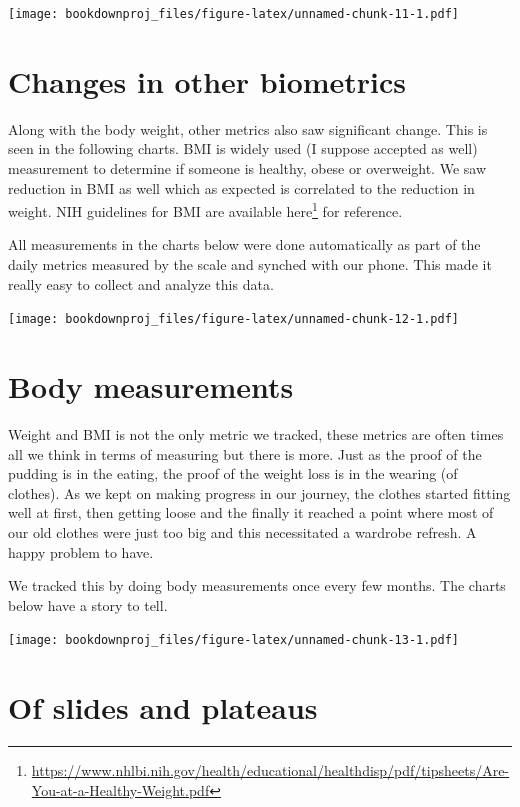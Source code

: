 \documentclass[
  oneside]{book}
\DeclareRobustCommand{\href}[2]{#2\footnote{\url{#1}}}
\begin{document}
\texttt{[image: bookdownproj\_files/figure-latex/unnamed-chunk-11-1.pdf]}

\hypertarget{changes-in-other-biometrics}{%
\section{Changes in other biometrics}\label{changes-in-other-biometrics}}

Along with the body weight, other metrics also saw significant change. This is seen in the following charts. BMI is widely used (I suppose accepted as well) measurement to determine if someone is healthy, obese or overweight. We saw reduction in BMI as well which as expected is correlated to the reduction in weight. NIH guidelines for BMI are available \href{https://www.nhlbi.nih.gov/health/educational/healthdisp/pdf/tipsheets/Are-You-at-a-Healthy-Weight.pdf}{here} for reference.

All measurements in the charts below were done automatically as part of the daily metrics measured by the scale and synched with our phone. This made it really easy to collect and analyze this data.

\texttt{[image: bookdownproj\_files/figure-latex/unnamed-chunk-12-1.pdf]}

\hypertarget{body-measurements}{%
\section{Body measurements}\label{body-measurements}}

Weight and BMI is not the only metric we tracked, these metrics are often times all we think in terms of measuring but there is more. Just as the proof of the pudding is in the eating, the proof of the weight loss is in the wearing (of clothes). As we kept on making progress in our journey, the clothes started fitting well at first, then getting loose and the finally it reached a point where most of our old clothes were just too big and this necessitated a wardrobe refresh. A happy problem to have.

We tracked this by doing body measurements once every few months. The charts below have a story to tell.

\texttt{[image: bookdownproj\_files/figure-latex/unnamed-chunk-13-1.pdf]}

\hypertarget{of-slides-and-plateaus}{%
\section{Of slides and plateaus}\label{of-slides-and-plateaus}}
\end{document}
